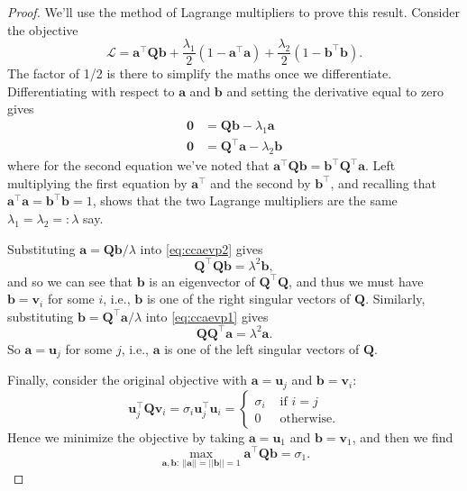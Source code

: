\documentclass[]{book}
\theoremstyle{definition}
\theoremstyle{definition}
\theoremstyle{definition}
\theoremstyle{remark}
\begin{document}
\begin{proof}
{}We'll use the method of Lagrange multipliers to prove this result. Consider the objective
\[\mathcal{L} = \mathbf a^\top \mathbf Q\mathbf b+\frac{\lambda_1}{2}(1-\mathbf a^\top\mathbf a)+\frac{\lambda_2}{2} (1-\mathbf b^\top \mathbf b).\]
The factor of 1/2 is there to simplify the maths once we differentiate.
Differentiating with respect to \(\mathbf a\) and \(\mathbf b\) and setting the derivative equal to zero gives
\begin{align}
\boldsymbol 0&= \mathbf Q\mathbf b-\lambda_1 \mathbf a\label{eq:ccaevp1}\\
\boldsymbol 0&= \mathbf Q^\top\mathbf a-\lambda_2 \mathbf b\label{eq:ccaevp2}
\end{align}
where for the second equation we've noted that \(\mathbf a^\top \mathbf Q\mathbf b= \mathbf b^\top \mathbf Q^\top \mathbf a\).
Left multiplying the first equation by \(\mathbf a^\top\) and the second by \(\mathbf b^\top\), and recalling that \(\mathbf a^\top \mathbf a=\mathbf b^\top\mathbf b=1\), shows that the two Lagrange multipliers are the same \(\lambda_1 = \lambda_2 =: \lambda\) say.

Substituting \(\mathbf a=\mathbf Q\mathbf b/\lambda\) into \eqref{eq:ccaevp2} gives
\[\mathbf Q^\top\mathbf Q\mathbf b= \lambda^2\mathbf b,\]
and so we can see that \(\mathbf b\) is an eigenvector of \(\mathbf Q^\top \mathbf Q\), and thus we must have \(\mathbf b= \mathbf v_i\) for some \(i\), i.e., \(\mathbf b\) is one of the right singular vectors of \(\mathbf Q\). Similarly, substituting \(\mathbf b= \mathbf Q^\top \mathbf a/\lambda\) into \eqref{eq:ccaevp1} gives
\[\mathbf Q\mathbf Q^\top \mathbf a= \lambda^2\mathbf a.\]
So \(\mathbf a=\mathbf u_j\) for some \(j\), i.e., \(\mathbf a\) is one of the left singular vectors of \(\mathbf Q\).

Finally, consider the original objective with \(\mathbf a=\mathbf u_j\) and \(\mathbf b=\mathbf v_i\):
\[\mathbf u_j^\top\mathbf Q\mathbf v_i = \sigma_i\mathbf u_j^\top \mathbf u_i = \begin{cases} \sigma_i &\mbox{ if } i = j\\
0 &\mbox{ otherwise.}
\end{cases}
\]
Hence we minimize the objective by taking \(\mathbf a=\mathbf u_1\) and \(\mathbf b=\mathbf v_1\), and then we find
\[\max_{\mathbf a, \mathbf b:\, \vert \vert \mathbf a\vert \vert=\vert \vert \mathbf b\vert \vert =1} \mathbf a^\top \mathbf Q\mathbf b=\sigma_1.\]
\end{proof}
\end{document}
